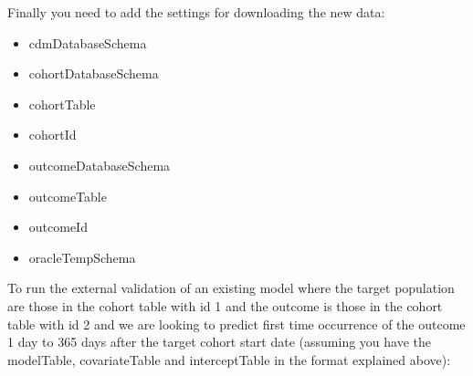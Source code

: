 \documentclass[]{article}
\providecommand{\tightlist}{%
  \setlength{\itemsep}{0pt}\setlength{\parskip}{0pt}}
\begin{document}
Finally you need to add the settings for downloading the new data:

\begin{itemize}
\tightlist
\item
  cdmDatabaseSchema
\item
  cohortDatabaseSchema
\item
  cohortTable
\item
  cohortId
\item
  outcomeDatabaseSchema
\item
  outcomeTable
\item
  outcomeId
\item
  oracleTempSchema
\end{itemize}

To run the external validation of an existing model where the target
population are those in the cohort table with id 1 and the outcome is
those in the cohort table with id 2 and we are looking to predict first
time occurrence of the outcome 1 day to 365 days after the target cohort
start date (assuming you have the modelTable, covariateTable and
interceptTable in the format explained above):
\end{document}
